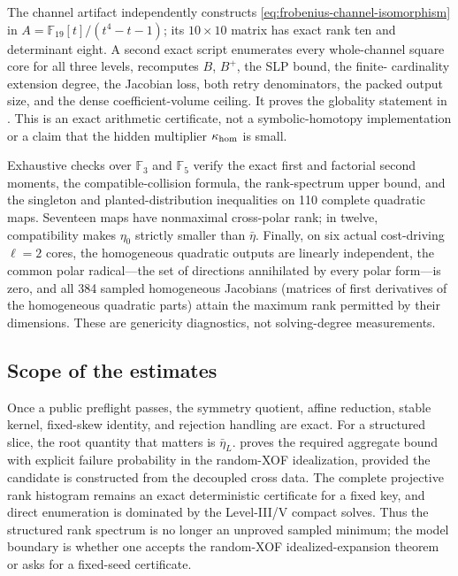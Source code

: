 \documentclass[11pt]{article}
\newcommand{\F}{\mathbb F}
\begin{document}
The channel artifact independently constructs
\eqref{eq:frobenius-channel-isomorphism} in
$A=\F_{19}[t]/(t^4-t-1)$; its $10\times10$ matrix has exact rank ten and
determinant eight.  A second exact script enumerates every whole-channel square
core for all three levels, recomputes $B$, $B^+$, the SLP bound, the finite-
cardinality extension degree, the Jacobian loss, both retry denominators, the
packed output size, and the dense coefficient-volume ceiling.  It proves the
globality statement in .  This is an exact
arithmetic certificate, not a symbolic-homotopy implementation or a claim that
the hidden multiplier $\kappa_{\rm hom}$ is small.

Exhaustive checks over $\F_3$ and $\F_5$ verify the exact first and factorial
second moments, the compatible-collision formula, the rank-spectrum upper bound,
and the singleton and planted-distribution inequalities on 110 complete
quadratic maps.  Seventeen maps have nonmaximal cross-polar rank; in twelve,
compatibility makes $\eta_0$ strictly smaller than $\bar\eta$.  Finally, on six actual cost-driving $\ell=2$ cores, the homogeneous
quadratic outputs are linearly independent, the common polar radical---the set
of directions annihilated by every polar form---is zero, and all 384 sampled
homogeneous Jacobians (matrices of first derivatives of the homogeneous
quadratic parts) attain the maximum rank permitted by their dimensions.  These
are genericity diagnostics, not solving-degree measurements.

\subsection{Scope of the estimates}

Once a public preflight passes, the symmetry quotient, affine reduction,
stable kernel, fixed-skew identity, and rejection handling are exact.  For a
structured slice, the root quantity that matters is $\bar\eta_L$.
 proves the required aggregate bound with explicit
failure probability in the random-XOF idealization, provided the candidate is
constructed from the decoupled cross data.  The complete projective rank
histogram remains an exact deterministic certificate for a fixed key, and
direct enumeration is dominated by the Level-III/V compact solves.  Thus the
structured rank spectrum is no longer an unproved sampled minimum; the model
boundary is whether one accepts the random-XOF idealized-expansion theorem or asks
for a fixed-seed certificate.
\end{document}
